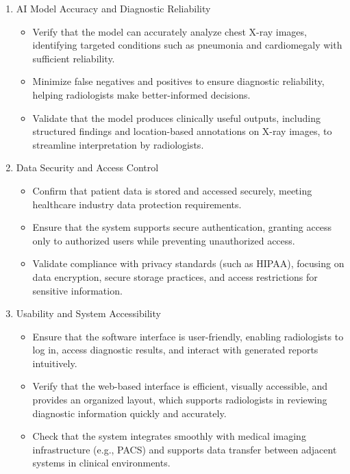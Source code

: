 \documentclass[12pt, titlepage]{article}
\begin{document}
\begin{enumerate}
  \item AI Model Accuracy and Diagnostic Reliability
    \begin{itemize}
      \item Verify that the model can accurately analyze chest X-ray images, identifying targeted conditions such as pneumonia and cardiomegaly with sufficient reliability.
      \item Minimize false negatives and positives to ensure diagnostic reliability, helping radiologists make better-informed decisions.
      \item Validate that the model produces clinically useful outputs, including structured findings and location-based annotations on X-ray images, to streamline interpretation by radiologists.
    \end{itemize}
  \item Data Security and Access Control
    \begin{itemize}
      \item Confirm that patient data is stored and accessed securely, meeting healthcare industry data protection requirements.
      \item Ensure that the system supports secure authentication, granting access only to authorized users while preventing unauthorized access.
      \item Validate compliance with privacy standards (such as HIPAA), focusing on data encryption, secure storage practices, and access restrictions for sensitive information.
    \end{itemize}
  \item Usability and System Accessibility
    \begin{itemize}
      \item Ensure that the software interface is user-friendly, enabling radiologists to log in, access diagnostic results, and interact with generated reports intuitively.
      \item Verify that the web-based interface is efficient, visually accessible, and provides an organized layout, which supports radiologists in reviewing diagnostic information quickly and accurately.
      \item Check that the system integrates smoothly with medical imaging infrastructure (e.g., PACS) and supports data transfer between adjacent systems in clinical environments.
    \end{itemize}
\end{enumerate}
\end{document}

